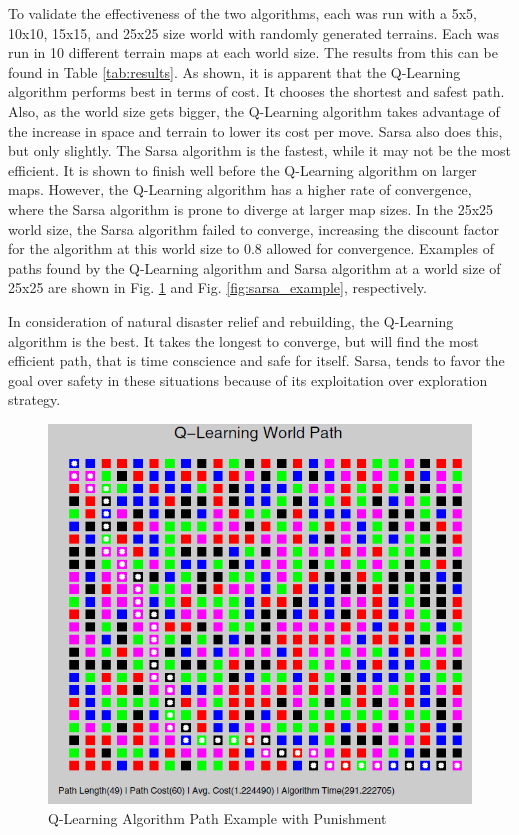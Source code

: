 \documentclass[12pt,american]{report}
\providecommand{\DIFaddbeginFL}{} %
\providecommand{\DIFaddendFL}{} %
\providecommand{\DIFdelbeginFL}{} %
\providecommand{\DIFdelendFL}{} %
\newcommand{\DIFscaledelfig}{0.5}
\newlength{\DIFdelgraphicswidth} %
\newlength{\DIFdelgraphicsheight} %
\newcommand{\DIFaddincludegraphics}[2][]{{\color{blue}\fbox{\DIFOincludegraphics[#1]{#2}}}} %
\newcommand{\DIFdelincludegraphics}[2][]{%
\sbox{\DIFdelgraphicsbox}{\DIFOincludegraphics[#1]{#2}}%
\settoboxwidth{\DIFdelgraphicswidth}{\DIFdelgraphicsbox} %
\settoboxtotalheight{\DIFdelgraphicsheight}{\DIFdelgraphicsbox} %
\scalebox{\DIFscaledelfig}{%
\parbox[b]{\DIFdelgraphicswidth}{\usebox{\DIFdelgraphicsbox}\\[-\baselineskip] \rule{\DIFdelgraphicswidth}{0em}}\llap{\resizebox{\DIFdelgraphicswidth}{\DIFdelgraphicsheight}{%
\setlength{\unitlength}{\DIFdelgraphicswidth}%
\begin{picture}(1,1)%
\thicklines\linethickness{2pt} %
{\color[rgb]{1,0,0}\put(0,0){\framebox(1,1){}}}%
{\color[rgb]{1,0,0}\put(0,0){\line( 1,1){1}}}%
{\color[rgb]{1,0,0}\put(0,1){\line(1,-1){1}}}%
\end{picture}%
}\hspace*{3pt}}} %
} %
\DeclareRobustCommand{\DIFaddbeginFL}{\DIFOaddbeginFL \let\includegraphics\DIFaddincludegraphics} %
\DeclareRobustCommand{\DIFaddendFL}{\DIFOaddendFL \let\includegraphics\DIFOincludegraphics} %
\DeclareRobustCommand{\DIFdelbeginFL}{\DIFOdelbeginFL \let\includegraphics\DIFdelincludegraphics} %
\DeclareRobustCommand{\DIFdelendFL}{\DIFOaddendFL \let\includegraphics\DIFOincludegraphics} %
\begin{document}
To validate the effectiveness of the two algorithms, each was run with a 5x5, 10x10, 15x15, and 25x25 size world with randomly generated terrains.  Each was run in 10 different terrain maps at each world size.  The results from this can be found in Table \ref{tab:results}.  As shown, it is apparent that the Q-Learning algorithm performs best in terms of cost.  It chooses the shortest and safest path. Also, as the world size gets bigger, the Q-Learning algorithm takes advantage of the increase in space and terrain to lower its cost per move. Sarsa also does this, but only slightly.  The Sarsa algorithm is the fastest, while it may not be the most efficient.  It is shown to finish well before the Q-Learning algorithm on larger maps.  However, the Q-Learning algorithm has a higher rate of convergence, where the Sarsa algorithm is prone to diverge at larger map sizes.  In the 25x25 world size, the Sarsa algorithm failed to converge, increasing the discount factor for the algorithm at this world size to 0.8 allowed for convergence. Examples of paths found by the Q-Learning algorithm and Sarsa algorithm at a world size of 25x25 are shown in Fig. \ref{fig:q-learning example} and Fig. \ref{fig:sarsa_example}, respectively.

In consideration of natural disaster relief and rebuilding, the Q-Learning algorithm is the best.  It takes the longest to converge, but will find the most efficient path, that is time conscience and safe for itself.  Sarsa, tends to favor the goal over safety in these situations because of its exploitation over exploration strategy. 


\begin{figure}
\centering
\DIFdelbeginFL %
\DIFdelendFL \DIFaddbeginFL \includegraphics[scale=.75]{images/q-learning-example.PNG}
\DIFaddendFL \caption{Q-Learning Algorithm Path Example with Punishment}
\label{fig:q-learning example}
\end{figure}
\end{document}
